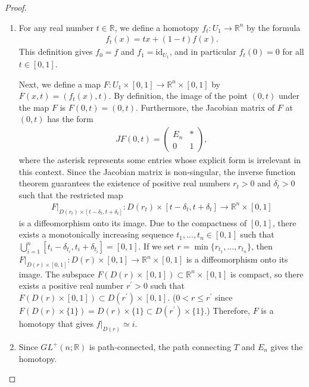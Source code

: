 \documentclass{amsart}
\theoremstyle{definition}
\theoremstyle{remark}
\begin{document}
\begin{proof}
\begin{enumerate}
\item
For any real number $t \in \mathbb{R}$, we define a homotopy $f_{t}\colon U_1 \to \mathbb{R}^n$
by the formula
\begin{align*}
f_t(x)=tx+(1-t)f(x).
\end{align*} 
This definition gives $f_0=f$ and $f_1=\mathrm{id}_{U_1}$, and in particular $f_t(0)=0$ for all $t\in[0,1]$.  

Next, we define a map $F\colon U_1\times [0,1] \to \mathbb{R}^n \times [0,1]$ by $F(x,t)=(f_t(x),t)$.
By definition, the image of the point $(0,t)$ under the map $F$ is $F(0,t)=(0,t)$.
Furthermore, the Jacobian matrix of $F$ at $(0,t)$ has the form  
\begin{align*}
J F(0,t)= 
\begin{pmatrix}
E_n & * \\
0 & 1
\end{pmatrix},
\end{align*}
where the asterisk represents some entries whose explicit form is irrelevant in this context.  
Since the Jacobian matrix is non-singular, the inverse function theorem guarantees the existence of positive real numbers $r_t>0$ and $\delta_t>0$ such that the restricted map 
\begin{align*}
F|_{D(r_t) \times [t-\delta_t, t+\delta_t]}\colon D(r_t) \times [t-\delta_t, t+\delta_t] \to \mathbb{R}^n \times [0,1]
\end{align*}
is a diffeomorphism onto its image.
Due to the compactness of $[0,1]$, there exists a monotonically increasing sequence 
$t_1,...,t_n\in [0,1]$ such that $\bigcup_{i=1}^{n}[t_i-\delta_{t_i},t_i+\delta_{t_i}]=[0,1]$.
If we set $r = \min \{r_{t_1}, \dots, r_{t_n}\}$, then $F|_{D(r) \times [0,1]} : D(r) \times [0,1] \to \mathbb{R}^n \times [0,1]$ is a diffeomorphism onto its image.
The subspace $F(D(r)\times [0,1])\subset \mathbb{R}^n\times [0,1]$
is compact, so there exists a positive real number $r^{\prime}>0$ such that $F(D(r)\times [0,1])\subset D(r^{\prime})\times [0,1]$.
($0<r\leq r^{\prime}$ since $F(D(r)\times \{1\})=D(r)\times \{1\} \subset D(r^{\prime})\times \{1\}$.)
Therefore, $F$ is a homotopy that gives $f|_{D(r)}\simeq i$.
\item Since \(GL^{+}(n;\mathbb{R})\) is path-connected, the path connecting \(T\) and \(E_n\) gives the homotopy.
\end{enumerate}
\end{proof}
\end{document}
